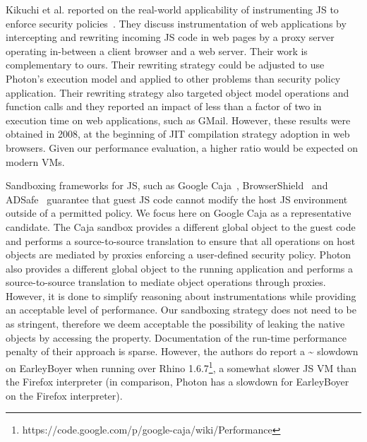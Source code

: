 
Kikuchi et al. reported on the real-world applicability of instrumenting
JS to enforce security policies~\cite{Kikuchi:2008}. They discuss
instrumentation of web applications  by intercepting and rewriting incoming
JS code in web pages by a proxy server operating in-between a client
browser and a web server. Their work is complementary to ours.
Their rewriting strategy could be adjusted to use Photon's execution model and
applied to other problems than security policy application.  Their rewriting
strategy also targeted object model operations and function calls and they
reported an impact of less than a factor of two in execution time on web
applications, such as GMail. However, these results were obtained in 2008, at
the beginning of JIT compilation strategy adoption in web browsers. Given our
performance evaluation, a higher ratio would be expected on modern VMs. 

Sandboxing frameworks for JS, such as Google Caja~\cite{Caja:2012},
BrowserShield~\cite{Reis:2007} and ADSafe~\cite{ADSafe:2013} guarantee that
guest JS code cannot modify the host JS environment outside of
a permitted policy. We focus here on Google Caja as a representative candidate.
The Caja sandbox provides a different global object to the guest code and
performs a source-to-source translation to ensure that all operations on host
objects are mediated by proxies enforcing a user-defined security policy.
Photon also provides a different global object to the running application and
performs a source-to-source translation to mediate object operations through
proxies. However, it is done to simplify reasoning about instrumentations while
providing an acceptable level of performance. Our sandboxing strategy does not
need to be as stringent, therefore we deem acceptable the possibility of
leaking the native objects by accessing the  property.
Documentation of the run-time performance penalty of their approach is sparse.
However, the authors do report a \~{ } slowdown on EarleyBoyer when
running over Rhino
1.6.7\footnote{https://code.google.com/p/google-caja/wiki/Performance}, a
somewhat slower JS VM than the Firefox interpreter (in comparison, Photon has a
 slowdown for EarleyBoyer on the Firefox interpreter).

